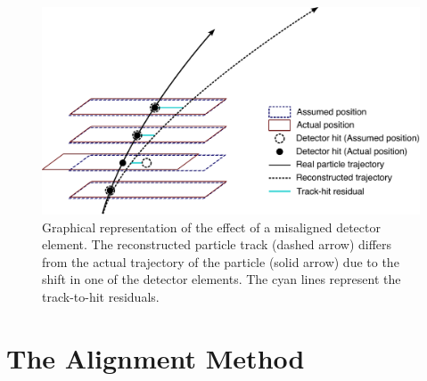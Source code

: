 \begin{figure}[htbp]
  \centering
  \includegraphics[width=.8\textwidth]{figs/alignment/misalignment}
  \caption{Graphical representation of the effect of a misaligned detector element.  The reconstructed particle track (dashed arrow) differs from the actual trajectory of the particle (solid arrow) due to the shift in one of the detector elements.  The cyan lines represent the track-to-hit residuals.}
  \label{fig:alignment_effects_misalign}
\end{figure}


%

\section{The Alignment Method}\label{align:method}


